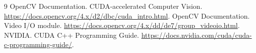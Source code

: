 \documentclass[14pt]{extarticle}
\begin{document}
\begin{thebibliography}{9}
 OpenCV Documentation. CUDA-accelerated Computer Vision. \url{https://docs.opencv.org/4.x/d2/dbc/cuda\_intro.html}.
 OpenCV Documentation. Video I/O module. \url{https://docs.opencv.org/4.x/dd/de7/group\_videoio.html}.
 NVIDIA. CUDA C++ Programming Guide. \url{https://docs.nvidia.com/cuda/cuda-c-programming-guide/}.
\end{thebibliography}
\end{document}
